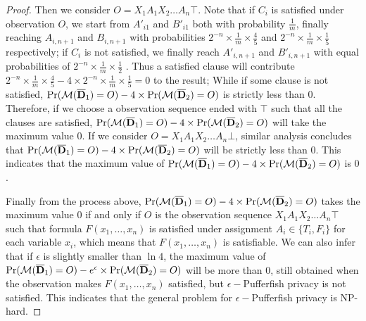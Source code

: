 \begin{proof}
  Then we consider $O=X_1A_1X_2\ldots A_n \top$. Note that if $C_i$ is satisfied under observation $O$, we start from $A'_{i1}$ and $B'_{i1}$ both with
  probability $\frac{1}{m}$, finally reaching $A_{i,n+1}$ and $B_{i,n+1}$ with probabilities $2^{-n} \times \frac{1}{m} \times \frac{4}{5}$
  and $2^{-n} \times \frac{1}{m} \times \frac{1}{5}$ respectively;
  if $C_i$ is not satisfied, we finally reach $A'_{i,n+1}$ and $B'_{i,n+1}$  with equal probabilities of $2^{-n}\times \frac{1}{m} \times \frac{1}{2}$ .
  Thus a satisfied clause will contribute $2^{-n} \times \frac{1}{m} \times \frac{4}{5} - 4 \times 2^{-n} \times \frac{1}{m} \times \frac{1}{5} = 0$ to
  the result; While if some clause is not satisfied, $\Pr (\mathcal{M} (\overline{\mathbf{D}}_1) = O)- 4\times \Pr (\mathcal{M} (\overline{\mathbf{D}}_2) = O)$ is strictly less than $0$.
  Therefore, if we choose a observation sequence ended with $\top$ such that all the
  clauses are satisfied, $\Pr (\mathcal{M} (\overline{\mathbf{D}}_1) = O)- 4\times \Pr (\mathcal{M} (\overline{\mathbf{D}}_2) = O)$ will take the maximum value 0.
  If we consider $O=X_1A_1X_2\ldots A_n \bot$, similar analysis concludes that $\Pr (\mathcal{M} (\overline{\mathbf{D}}_1) = O) - 4 \times \Pr (\mathcal{M} (\overline{\mathbf{D}}_2) = O)$
  will be strictly less than $0$.
  This indicates that the maximum value of $\Pr (\mathcal{M} (\overline{\mathbf{D}}_1) = O) - 4 \times \Pr (\mathcal{M} (\overline{\mathbf{D}}_2) = O)$ is $0$.

  Finally from the process above,
  $\Pr (\mathcal{M} (\overline{\mathbf{D}}_1) = O) - 4 \times \Pr (\mathcal{M} (\overline{\mathbf{D}}_2) = O)$ takes the maximum value $0$
  if and only if $O$ is the observation sequence $X_1A_1X_2\ldots A_n \top$ such that
  formula $F(x_1,\ldots,x_n)$ is satisfied under assignment $A_i \in \{T_i,F_i\}$ for each variable $x_i$,
  which means that $F(x_1,\ldots,x_n)$ is satisfiable.
  We can also infer that if $\epsilon$ is slightly smaller than $\ln 4$, the maximum value of
  $\Pr (\mathcal{M} (\overline{\mathbf{D}}_1) = O) - e ^\epsilon \times \Pr (\mathcal{M} (\overline{\mathbf{D}}_2) = O)$ will be more than $0$,
  still obtained when the observation makes $F(x_1,\ldots,x_n)$ satisfied,
  but $\epsilon-$Pufferfish privacy is not satisfied.
  This indicates that the general problem for $\epsilon-$Pufferfish privacy is NP-hard.

 \iffalse
  The "if" direction can be immediately proved from the process of finding the maximum.
  For the "only if" direction, with proof by contradiction, assume that $\Pr (\calM (\oD_1) = O) - \Pr (\calM (\oD_2) = O)$ takes
  value $2^{-n}$ but $O$ doesn't satisfy above condition. With the analysis before, the observation must be in the form
  of $O=X_1A_1X_2\ldots A_n \top$, where the assignment implied by $O$ doesn't satisfy $F(x_1,\ldots,x_n)$.
  So some clause $C_i$ is not satisfied and starting from $A'_{ij}$ the probability of
  observe $O$ is $2^{-n-1}\times \frac{1}{m}$. Therefore the sum of all the clauses observing
  $O$ is smaller than $2^{-n}$ since a clause which is satisfied only has a distribution
  of  $2^{-n}\times \frac{1}{m}$ observing $O$. That's a contradiction.
 \fi
\end{proof} 